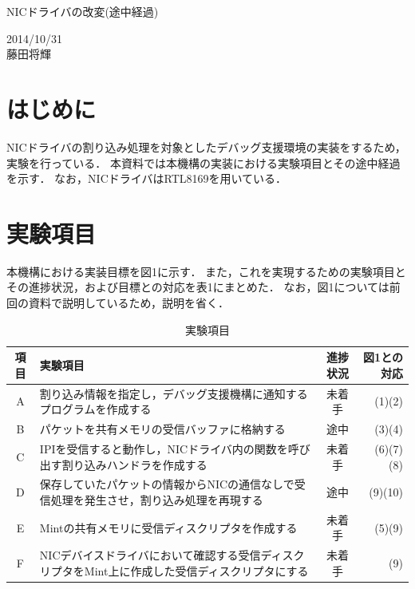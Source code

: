 \documentclass[12pt]{jsarticle}
\begin{document}

\begin{center}
{\LARGE NICドライバの改変(途中経過)}
\end{center}

\begin{flushright}
  2014/10/31\\
  藤田将輝
\end{flushright}
\section{はじめに}

NICドライバの割り込み処理を対象としたデバッグ支援環境の実装をするため，
実験を行っている．
本資料では本機構の実装における実験項目とその途中経過を示す．
なお，NICドライバはRTL8169を用いている．

\section{実験項目}
本機構における実装目標を図1に示す．
また，これを実現するための実験項目とその進捗状況，および目標との対応を表1にまとめた．
なお，図1については前回の資料で説明しているため，説明を省く．

\begin{table}[htb]
\caption{実験項目}
\begin{center}
  \begin{tabular}{c|p{8cm}|c|r} \hline
    項目 & 実験項目 & 進捗状況 & 図1との対応 \\ \hline \hline
    A & 割り込み情報を指定し，デバッグ支援機構に通知するプログラムを作成する & 未着手 & (1)(2) \\ \hline
    B & パケットを共有メモリの受信バッファに格納する & 途中 & (3)(4) \\ \hline
    C & IPIを受信すると動作し，NICドライバ内の関数を呼び出す割り込みハンドラを作成する & 未着手 & (6)(7)(8) \\ \hline
    D & 保存していたパケットの情報からNICの通信なしで受信処理を発生させ，割り込み処理を再現する & 途中 & (9)(10) \\ \hline
    E & Mintの共有メモリに受信ディスクリプタを作成する & 未着手 & (5)(9) \\ \hline
    F & NICデバイスドライバにおいて確認する受信ディスクリプタをMint上に作成した受信ディスクリプタにする & 未着手 & (9) \\ \hline
  \end{tabular}
  \end{center}
\end{table}
\end{document}
